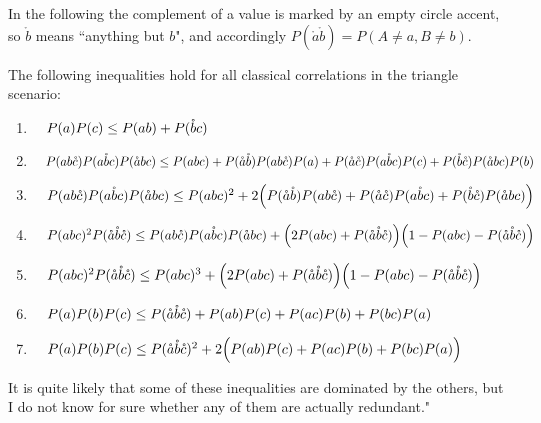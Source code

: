 In the following the complement of a value is marked by an empty circle accent, so $\mathring{b}$ means ``anything but $b$", and accordingly $P(\mathring{a}\mathring{b})=P(A\mathopen{\neq}a,B\mathopen{\neq}b)$. 
\begin{theorem}
The following inequalities hold for all classical correlations in the triangle scenario:
\begin{enumerate}
\item
\(\quad
P(a) P(c)  \leq  P(a b) + P(\nb c)
\)
\item
\(\quad
P(a b\nc) P(a \nb c) P(\na b c) \leq P(a b c) + P(\na \nb) P(a b \nc) P(a) + P(\na\nc) P(a\nb c) P(c)  + P(\nb \nc) P(\na b c) P(b)
\)
\item 
\(\quad
P(a b\nc) P(a \nb c) P(\na b c) \leq P(a b c)^2 + 2\parens*{P(\na \nb) P(a b \nc) + P(\na\nc) P(a\nb c)  + P(\nb \nc) P(\na b c)}
\)
\item
\(\quad
P(a b c)^2 P(\na\nb\nc)  \leq  P(a b \nc) P(a \nb c) P(\na b c) + \parens*{2 P(a b c) + P(\na\nb\nc)} \parens*{1 - P(a b c) - P(\na\nb\nc)}
\)
\item
\(\quad
P(a b c)^2 P(\na\nb\nc)  \leq  P(a b c)^3 + \parens*{2 P(a b c) + P(\na\nb\nc)} \parens*{1 - P(a b c) - P(\na\nb\nc)}
\)
\item
\(\quad
P(a) P(b) P(c) \leq  P(\na\nb\nc) + P(a b) P(c) + P(a c) P(b) + P(b c) P(a)
\)
\item
\(\quad
P(a) P(b) P(c) \leq  P(\na\nb\nc)^2 +2\parens[\Big]{ P(a b) P(c) + P(a c) P(b) + P(b c) P(a) }
\)
\end{enumerate}
\end{theorem}

It is quite likely that some of these inequalities are dominated by the others, but I do not know for sure whether any of them are actually redundant."


